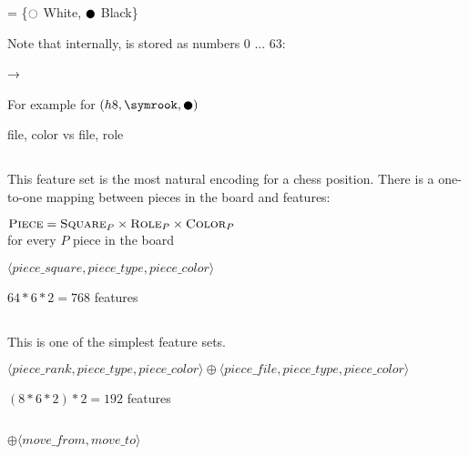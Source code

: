  = \{$\white$ White, $\black$ Black\}

Note that internally,  is stored as numbers 0 ... 63:

\pieceBoard → \pieceBoard


For example for $(h8, \symrook, \black)$

file, color vs file, role

\subsection{\mdseries{}}

This feature set is the most natural encoding for a chess position. There is a one-to-one mapping between pieces in the board and features:

\begin{center}
    $\textsc{Piece} = \textsc{Square}_{P} \times \textsc{Role}_{P} \times \textsc{Color}_{P}$ \\
    for every $P$ piece in the board
\end{center}




$\langle piece\_square, piece\_type, piece\_color \rangle$

$64*6*2=768$ features


\subsection{\mdseries{}}

This is one of the simplest feature sets.

$\langle piece\_rank, piece\_type, piece\_color \rangle \oplus \langle piece\_file, piece\_type, piece\_color \rangle$

$(8*6*2)*2=192$ features

\subsection{\mdseries{}}

 $\oplus \langle move\_from, move\_to \rangle$


